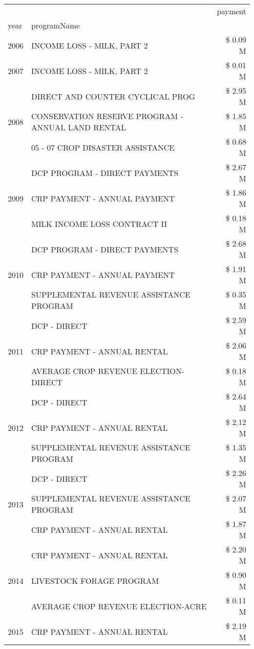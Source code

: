 \begin{tabular}{llr}
\toprule
 &  & payment \\
year & programName &  \\
\midrule
2006 & INCOME LOSS - MILK, PART 2 & \$ 0.09 M \\
\cline{1-3}
2007 & INCOME LOSS - MILK, PART 2 & \$ 0.01 M \\
\cline{1-3}
\multirow[t]{3}{*}{2008} & DIRECT AND COUNTER CYCLICAL PROG & \$ 2.95 M \\
 & CONSERVATION RESERVE PROGRAM - ANNUAL LAND RENTAL & \$ 1.85 M \\
 & 05 - 07 CROP DISASTER ASSISTANCE & \$ 0.68 M \\
\cline{1-3}
\multirow[t]{3}{*}{2009} & DCP PROGRAM - DIRECT PAYMENTS & \$ 2.67 M \\
 & CRP PAYMENT - ANNUAL PAYMENT & \$ 1.86 M \\
 & MILK INCOME LOSS CONTRACT II & \$ 0.18 M \\
\cline{1-3}
\multirow[t]{3}{*}{2010} & DCP PROGRAM - DIRECT PAYMENTS & \$ 2.68 M \\
 & CRP PAYMENT - ANNUAL PAYMENT & \$ 1.91 M \\
 & SUPPLEMENTAL REVENUE ASSISTANCE PROGRAM & \$ 0.35 M \\
\cline{1-3}
\multirow[t]{3}{*}{2011} & DCP - DIRECT & \$ 2.59 M \\
 & CRP PAYMENT - ANNUAL RENTAL & \$ 2.06 M \\
 & AVERAGE CROP REVENUE ELECTION-DIRECT & \$ 0.18 M \\
\cline{1-3}
\multirow[t]{3}{*}{2012} & DCP - DIRECT & \$ 2.64 M \\
 & CRP PAYMENT - ANNUAL RENTAL & \$ 2.12 M \\
 & SUPPLEMENTAL REVENUE ASSISTANCE PROGRAM & \$ 1.35 M \\
\cline{1-3}
\multirow[t]{3}{*}{2013} & DCP - DIRECT & \$ 2.26 M \\
 & SUPPLEMENTAL REVENUE ASSISTANCE PROGRAM & \$ 2.07 M \\
 & CRP PAYMENT - ANNUAL RENTAL & \$ 1.87 M \\
\cline{1-3}
\multirow[t]{3}{*}{2014} & CRP PAYMENT - ANNUAL RENTAL & \$ 2.20 M \\
 & LIVESTOCK FORAGE PROGRAM & \$ 0.90 M \\
 & AVERAGE CROP REVENUE ELECTION-ACRE & \$ 0.11 M \\
\cline{1-3}
\multirow[t]{3}{*}{2015} & CRP PAYMENT - ANNUAL RENTAL & \$ 2.19 M \\

\end{tabular}
